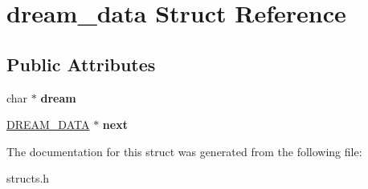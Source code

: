 \hypertarget{structdream__data}{\section{dream\-\_\-data Struct Reference}
\label{structdream__data}
}
\subsection*{Public Attributes}
\begin{DoxyCompactItemize}
\item 
\hypertarget{structdream__data_aea9276513590fc79128391f74fcd7554}{char $\ast$ {\bfseries dream}}\label{structdream__data_aea9276513590fc79128391f74fcd7554}

\item 
\hypertarget{structdream__data_acecda9e6ae4cfe6ecdf5a04b3575c025}{\hyperlink{structdream__data}{D\-R\-E\-A\-M\-\_\-\-D\-A\-T\-A} $\ast$ {\bfseries next}}\label{structdream__data_acecda9e6ae4cfe6ecdf5a04b3575c025}

\end{DoxyCompactItemize}


The documentation for this struct was generated from the following file\-:\begin{DoxyCompactItemize}
\item 
structs.\-h\end{DoxyCompactItemize}
